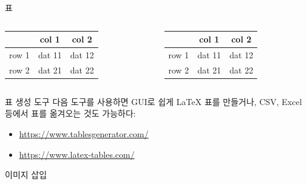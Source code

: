 \documentclass[compress]{beamer}
\begin{document}
\begin{frame}[fragile=singleslide]{표}
  \begin{columns}
    \begin{column}{0.5\textwidth}
      \begin{latexcode}
        \begin{tabular}{r|cc}
          & col 1 & col 2\\
          \hline
          row 1 & dat 11 & dat 12\\
          row 2 & dat 21 & dat 22\\
        \end{tabular}
      \end{latexcode}
    \end{column}
    \begin{column}{0.5\textwidth}
      \begin{tabular}{r|cc}
        & col 1 & col 2\\
        \hline
        row 1 & dat 11 & dat 12\\
        row 2 & dat 21 & dat 22\\
      \end{tabular}
    \end{column}
  \end{columns}
  \begin{alertblock}{표 생성 도구}
    다음 도구를 사용하면 GUI로 쉽게 \LaTeX{} 표를 만들거나, CSV, Excel 등에서
    표를 옮겨오는 것도 가능하다:
    \begin{itemize}
      \item \url{https://www.tablesgenerator.com/}
      \item \url{https://www.latex-tables.com/}
    \end{itemize}
  \end{alertblock}
\end{frame}

\begin{frame}[fragile=singleslide]{이미지 삽입}
\end{frame}
\end{document}
